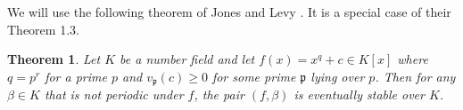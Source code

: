 \documentclass[11pt]{amsart}
\newtheorem{thm}{Theorem}
\newtheorem{cor}[thm]{Corollary}
\theoremstyle{definition}
\theoremstyle{definition}
\numberwithin{thm}{section}
\numberwithin{equation}{thm}
\newcommand{\fp}{\ensuremath{{\mathfrak{p}}}}
\newcommand{\ba}{{\boldsymbol \alpha}}
\DeclareMathOperator{\Gal}{Gal}
\begin{document}


We will use the following theorem of Jones and Levy \cite{RafeAlon}.
It is a special case of their Theorem 1.3.  

\begin{thm}\label{JL-thm}
Let $K$ be a number field and let $f(x) = x^q + c\in K[x]$ where $q = p^r$ for
a prime $p$ and $v_\fp(c)\ge 0$ for some prime $\fp$ lying over $p$.  Then for any $\beta \in K$ that is
not periodic under $f$, the pair $(f,\beta)$ is eventually stable over $K$.  
\end{thm}
\end{document}
